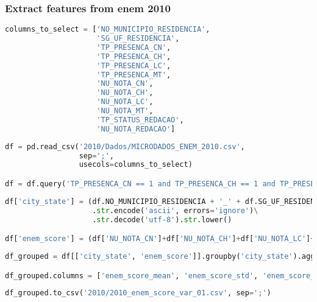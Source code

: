 \hypertarget{extract-features-from-enem-2010}{%
\subsubsection{Extract features from enem
2010}\label{extract-features-from-enem-2010}}

\begin{lstlisting}[language=Python]
columns_to_select = ['NO_MUNICIPIO_RESIDENCIA',
                     'SG_UF_RESIDENCIA',
                     'TP_PRESENCA_CN',
                     'TP_PRESENCA_CH',
                     'TP_PRESENCA_LC',
                     'TP_PRESENCA_MT',
                     'NU_NOTA_CN',
                     'NU_NOTA_CH',
                     'NU_NOTA_LC',
                     'NU_NOTA_MT',
                     'TP_STATUS_REDACAO',
                     'NU_NOTA_REDACAO']
\end{lstlisting}

\begin{lstlisting}[language=Python]
df = pd.read_csv('2010/Dados/MICRODADOS_ENEM_2010.csv',
                 sep=';',
                 usecols=columns_to_select)

df = df.query('TP_PRESENCA_CN == 1 and TP_PRESENCA_CH == 1 and TP_PRESENCA_LC == 1 and TP_PRESENCA_MT == 1 and TP_STATUS_REDACAO == "P"')
\end{lstlisting}

\begin{lstlisting}[language=Python]
df['city_state'] = (df.NO_MUNICIPIO_RESIDENCIA + '_' + df.SG_UF_RESIDENCIA).str.normalize('NFKD')\
                    .str.encode('ascii', errors='ignore')\
                    .str.decode('utf-8').str.lower()

df['enem_score'] = (df['NU_NOTA_CN']+df['NU_NOTA_CH']+df['NU_NOTA_LC']+df['NU_NOTA_MT']+df['NU_NOTA_REDACAO'])/5
\end{lstlisting}

\begin{lstlisting}[language=Python]
df_grouped = df[['city_state', 'enem_score']].groupby('city_state').agg(['mean', 'std', 'median'])

df_grouped.columns = ['enem_score_mean', 'enem_score_std', 'enem_score_median']
\end{lstlisting}

\begin{lstlisting}[language=Python]
df_grouped.to_csv('2010/2010_enem_score_var_01.csv', sep=';')
\end{lstlisting}

